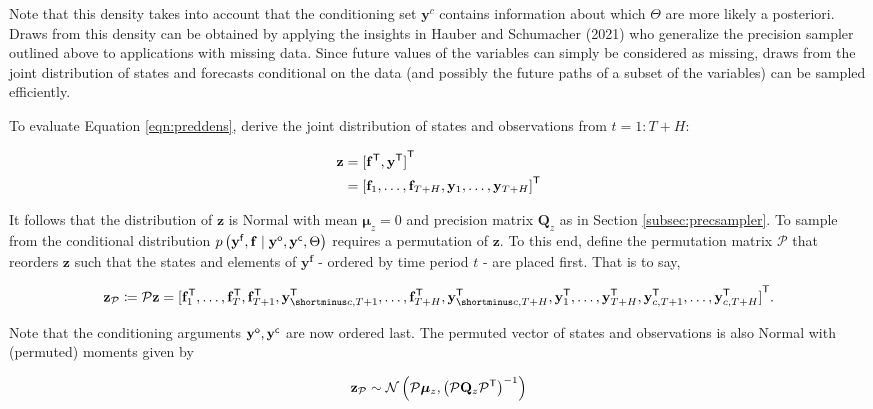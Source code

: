 \documentclass[notitlepage,a4paper,12pt]{article}
\newcommand{\transpose}[1]{{#1}^{\sf{T}}}
\begin{document}
Note that this density takes into account that the conditioning set $\mathbf{y}^c$ contains information about which $\Theta$ are more likely a posteriori. Draws from this density can be obtained by applying the insights in Hauber and Schumacher (2021) who generalize the precision sampler outlined above to applications with missing data. Since future values of the variables can simply be considered as missing, draws from the joint distribution of states and forecasts conditional on the data (and possibly the future paths of a subset of the variables) can be sampled efficiently.

To evaluate Equation \ref{eqn:preddens}, derive the joint distribution of states and observations from $t=1:T+H$: 

\begin{align*}
    \mathbf{z} &= \transpose{[\transpose{\mathbf{f}}, \transpose{\mathbf{y}}]} \\
     &= \transpose{[\mathbf{f}_1, \dots, \mathbf{f}_{T+H}, \mathbf{y}_1, \dots, \mathbf{y}_{T+H}]} 
\end{align*}

It follows that the distribution of $\mathbf{z}$ is Normal with mean $\boldsymbol{\mu}_{z} = 0$ and precision matrix $\mathbf{Q}_{z}$ as in Section \ref{subsec:precsampler}. To sample from the conditional distribution $p\left(\mathbf{y}^{\sf{f}}, \mathbf{f} \mid \mathbf{y}^{\sf{o}}, \mathbf{y}^{\sf{c}}, \Theta \right)$  requires a permutation of $\mathbf{z}$. To this end, define the permutation matrix $\mathcal{P}$ that reorders $\mathbf{z}$ such that the states and elements of $\mathbf{y^f}$ - ordered by time period $t$ - are placed first. That is to say,

$$
\mathbf{z}_{\mathcal{P}} \coloneqq \mathcal{P} \mathbf{z} =
 \transpose{[
     \mathbf{f}^{\sf{T}}_1, 
     \dots, 
     \mathbf{f}^{\sf{T}}_T, 
     \mathbf{f}^{\sf{T}}_{T+1}, 
     \mathbf{y}^{\sf{T}}_{\shortminus c,T+1}, 
     \dots, 
     \mathbf{f}^{\sf{T}}_{T+H}, 
     \mathbf{y}^{\sf{T}}_{\shortminus c,T+H},
     \mathbf{y}^{\sf{T}}_1,
     \dots,
     \mathbf{y}^{\sf{T}}_{T+H},
     \mathbf{y}^{\sf{T}}_{c, T+1},
     \dots, 
     \mathbf{y}^{\sf{T}}_{c, T+H}]}.
$$

Note that the conditioning arguments $\mathbf{y}^{\sf{o}}, \mathbf{y}^{\sf{c}}$ are now ordered last. The permuted vector of states and observations is also Normal with (permuted) moments given by 

\begin{equation*}
    \mathbf{z_{\mathcal{P}}} \sim \mathcal{N}\left(\mathcal{P}\boldsymbol{\mu}_z, \left(\mathcal{P} \mathbf{Q}_z \transpose{\mathcal{P}}\right)^{-1}\right)
\end{equation*}
\end{document}
